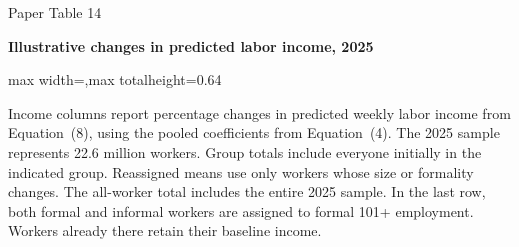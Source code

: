 \begin{frame}{Paper Table 14}
\begin{minipage}{\textwidth}\small\textbf{Illustrative changes in predicted labor income, 2025}\end{minipage}\par\vspace{0.15cm}
\centering\begingroup\fontsize{8.5}{10}\selectfont
\setlength{\tabcolsep}{4pt}\renewcommand{\arraystretch}{1.06}
\begin{adjustbox}{max width=\textwidth,max totalheight=0.64\textheight}

\end{adjustbox}\endgroup\par\vspace{0.10cm}
{\fontsize{6.5}{7.5}\selectfont\raggedright Income columns report percentage changes in predicted weekly labor income from Equation~(8), using the pooled coefficients from Equation~(4). The 2025 sample represents 22.6 million workers. Group totals include everyone initially in the indicated group. Reassigned means use only workers whose size or formality changes. The all-worker total includes the entire 2025 sample. In the last row, both formal and informal workers are assigned to formal 101+ employment. Workers already there retain their baseline income.\par}
\end{frame}

